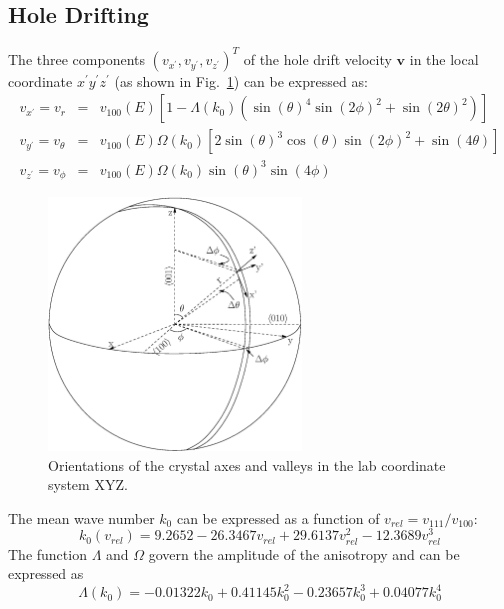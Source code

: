 \subsection{Hole Drifting}
\label{sec:hole}
The three components $(v_{x^{\prime}}, v_{y^{\prime}}, v_{z^{\prime}})^{T}$ of the hole drift velocity $\mathbf{v}$ in the local coordinate $x^{\prime}y^{\prime}z^{\prime}$ (as shown in Fig.~\ref{fig:vsphere}) can be expressed as:
\begin{equation}
  \label{eq:vsphere}
  \begin{array}{rcl}
   v_{x^{\prime}} = v_{r} &=& v_{100}(E)[1-\Lambda(k_{0})(\sin(\theta)^{4}\sin(2\phi)^{2} + \sin(2\theta)^{2})]\\
   v_{y^{\prime}} = v_{\theta} &=& v_{100}(E)\Omega(k_{0})[2\sin(\theta)^{3}\cos(\theta)\sin(2\phi)^{2} + \sin(4\theta)]\\
    v_{z^{\prime}} = v_{\phi} &=& v_{100}(E)\Omega(k_{0})\sin(\theta)^{3}\sin(4\phi)
  \end{array}
\end{equation}
\begin{figure}[tbhp]
  \centering
  \includegraphics[width=0.6\textwidth]{vsphere.eps}  
  \caption{Orientations of the crystal axes and valleys in the lab
coordinate system XYZ.}
  \label{fig:vsphere}
\end{figure}
The mean wave number $k_{0}$ can be expressed as a function of $v_{rel} = v_{111}/v_{100}$:
\begin{equation}
  \label{eq:k0}
   k_{0}(v_{rel}) = 9.2652 - 26.3467v_{rel} + 29.6137v_{rel}^{2} - 12.3689v_{rel}^{3}
\end{equation}
The function $\Lambda$ and $\Omega$ govern the amplitude of the anisotropy and can be expressed as
\begin{equation}
  \label{eq:lamb}
   \Lambda(k_{0}) = -0.01322k_{0} + 0.41145k_{0}^{2} - 0.23657k_{0}^{3} + 0.04077k_{0}^{4}
\end{equation}
